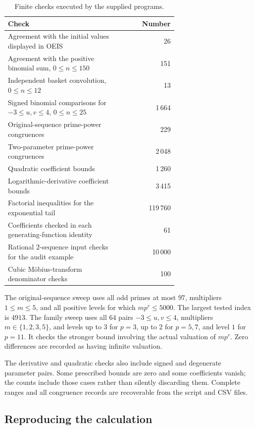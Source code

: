 \documentclass[11pt,a4paper]{article}
\numberwithin{equation}{section}
\theoremstyle{definition}
\theoremstyle{remark}
\begin{document}
\begin{table}[htbp]
\centering
\caption{Finite checks executed by the supplied programs.}
\label{tab:checks}
\small
\begin{tabular}{p{0.68\linewidth}r}
\toprule
Check & Number\\
\midrule
Agreement with the initial values displayed in OEIS & 26\\
Agreement with the positive binomial sum, $0\leq n\leq150$ & 151\\
Independent basket convolution, $0\leq n\leq12$ & 13\\
Signed binomial comparisons for $-3\leq u,v\leq4$, $0\leq n\leq25$ & 1\,664\\
Original-sequence prime-power congruences & 229\\
Two-parameter prime-power congruences & 2\,048\\
Quadratic coefficient bounds & 1\,260\\
Logarithmic-derivative coefficient bounds & 3\,415\\
Factorial inequalities for the exponential tail & 119\,760\\
Coefficients checked in each generating-function identity & 61\\
Rational $2$-sequence input checks for the audit example & 10\,000\\
Cubic M\"obius-transform denominator checks & 100\\
\bottomrule
\end{tabular}
\end{table}

The original-sequence sweep uses all odd primes at most $97$, multipliers
$1\leq m\leq5$, and all positive levels for which $mp^r\leq5000$.
The largest tested index is $4913$. The family sweep uses all $64$ pairs
$-3\leq u,v\leq4$, multipliers $m\in\{1,2,3,5\}$, and levels up to $3$
for $p=3$, up to $2$ for $p=5,7$, and level $1$ for $p=11$.
It checks the stronger bound involving the actual valuation of $mp^r$.
Zero differences are recorded as having infinite valuation.

The derivative and quadratic checks also include signed and degenerate
parameter pairs. Some prescribed bounds are zero and some coefficients
vanish; the counts include those cases rather than silently discarding
them. Complete ranges and all congruence records are recoverable from
the script and CSV files.

\subsection{Reproducing the calculation}
\end{document}
